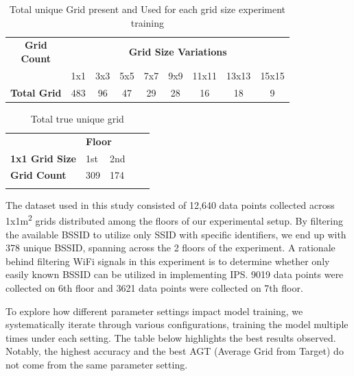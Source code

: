 \documentclass[conference]{IEEEtran}
\begin{document}
	\begin{table}[htbp]
		\centering
		\begin{tabular}{|c|c|c|c|c|c|c|c|c|}
			\hline
			\makecell{\textbf{Grid}\\\textbf{Count}} & \multicolumn{8}{c|}{\textbf{Grid Size Variations}} \\
			\cline{2-9}
			& 1x1 & 3x3 & 5x5 & 7x7 & 9x9 & 11x11 & 13x13 & 15x15 \\
			\hline
			\textbf{Total Grid} & 483 & 96 & 47 & 29 & 28 & 16 & 18 & 9 \\
			\hline
		\end{tabular}
		\caption{Total unique Grid present and Used for each grid size experiment training}
		\label{tab:grid_size_variations}
	\end{table}
	
	\begin{table}[htbp]
		\centering
		\begin{tabular}{lllll}
		\cline{1-3}
		\multicolumn{1}{|l|}{}              & \multicolumn{2}{l|}{\textbf{Floor}}                          &  &  \\ \cline{1-3}
		\multicolumn{1}{|l|}{\textbf{1x1 Grid Size}} & \multicolumn{1}{l|}{1st}   & \multicolumn{1}{l|}{2nd}   &  &  \\ \cline{1-3}
		\multicolumn{1}{|l|}{\textbf{Grid Count}}    & \multicolumn{1}{l|}{309} & \multicolumn{1}{l|}{174} &  &  \\ \cline{1-3}
		&                          &                          &  & 
		\end{tabular}
		\caption{Total true unique grid}
		\label{tab:Total true unique grid} 
	\end{table}
	
	The dataset used in this study consisted of 12,640 data points collected across 1x1m\textsuperscript{2} grids distributed among the floors of our experimental setup. By filtering the available BSSID to utilize only SSID with specific identifiers, we end up with 378 unique BSSID, spanning across the 2 floors of the experiment. A rationale behind filtering WiFi signals in this experiment is to determine whether only easily known BSSID can be utilized in implementing IPS. 9019 data points were collected on 6th floor and 3621 data points were collected on 7th floor.
	
	To explore how different parameter settings impact model training, we systematically iterate through various configurations, training the model multiple times under each setting. The table below highlights the best results observed. Notably, the highest accuracy and the best AGT (Average Grid from Target) do not come from the same parameter setting.
	
\end{document}
